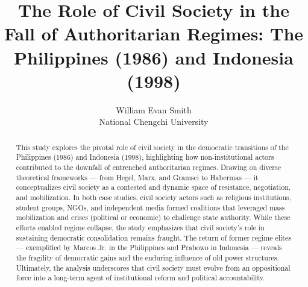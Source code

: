 \documentclass[12pt]{article}
\title{The Role of Civil Society in the Fall of Authoritarian Regimes: The Philippines (1986) and Indonesia (1998)}
\author{William Evan Smith\\National Chengchi University}
\date{}
\begin{document}
\maketitle

\begin{abstract}
This study explores the pivotal role of civil society in the democratic transitions of the Philippines (1986) and Indonesia (1998), highlighting how non-institutional actors contributed to the downfall of entrenched authoritarian regimes. Drawing on diverse theoretical frameworks — from Hegel, Marx, and Gramsci to Habermas — it conceptualizes civil society as a contested and dynamic space of resistance, negotiation, and mobilization. In both case studies, civil society actors such as religious institutions, student groups, NGOs, and independent media formed coalitions that leveraged mass mobilization and crises (political or economic) to challenge state authority. While these efforts enabled regime collapse, the study emphasizes that civil society’s role in sustaining democratic consolidation remains fraught. The return of former regime elites — exemplified by Marcos Jr. in the Philippines and Prabowo in Indonesia — reveals the fragility of democratic gains and the enduring influence of old power structures. Ultimately, the analysis underscores that civil society must evolve from an oppositional force into a long-term agent of institutional reform and political accountability.
\end{abstract}


\newpage
\end{document}
